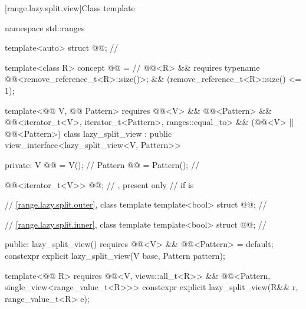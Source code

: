 [range.lazy.split.view]{Class template }

%
%
%
%
\begin{codeblock}
namespace std::ranges {
  template<auto> struct @@;                       // \expos

  template<class R>
  concept @@ =                                          // \expos
    @@<R> &&
    requires { typename @@<remove_reference_t<R>::size()>; } &&
    (remove_reference_t<R>::size() <= 1);

  template<@@ V, @@ Pattern>
    requires @@<V> && @@<Pattern> &&
             @@<iterator_t<V>, iterator_t<Pattern>, ranges::equal_to> &&
             (@@<V> || @@<Pattern>)
  class lazy_split_view : public view_interface<lazy_split_view<V, Pattern>> {
  private:
    V @@ = V();                                              // \expos
    Pattern @@ = Pattern();                               // \expos

    @@<iterator_t<V>> @@;              // \expos, present only
                                                                // if  is 

    // \ref{range.lazy.split.outer}, class template 
    template<bool> struct @@;                       // \expos

    // \ref{range.lazy.split.inner}, class template 
    template<bool> struct @@;                       // \expos

  public:
    lazy_split_view()
      requires @@<V> && @@<Pattern> = default;
    constexpr explicit lazy_split_view(V base, Pattern pattern);

    template<@@ R>
      requires @@<V, views::all_t<R>> &&
               @@<Pattern, single_view<range_value_t<R>>>
    constexpr explicit lazy_split_view(R&& r, range_value_t<R> e);

}}
\end{codeblock}
